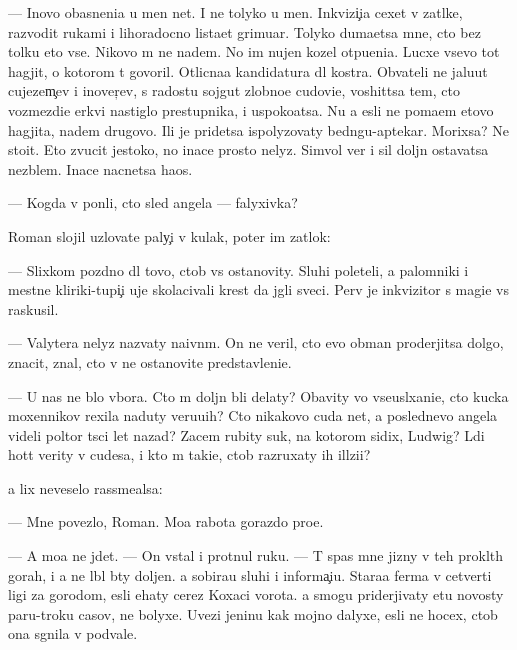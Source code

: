 \documentclass[10pt]{book}
\begin{document}
— Inovo ob{\y}asneni{\y}a u men{\ia} net. I ne tolyko u men{\ia}. Inkvizi{\c}i{\y}a cexet v zat{\yi}lke, razvodit rukami i lihoradocno lista{\y}et grimuar{\yi}. Tolyko duma{\y}etsa mne, cto bez tolku eto vse. Nikovo m{\yi} ne na{\y}dem. No im nujen kozel otpu{\x}eni{\y}a. Lucxe vsevo tot hagjit, o kotorom t{\yi} govoril. Otlicna{\y}a kandidatura dl{\ia} kostra. Ob{\yi}vateli ne jalu{\y}ut cujezem{\c}ev i inover{\c}ev, s radost{\y}u sojgut zlobno{\y}e cudovi{\x}e, voshit{\ia}tsa tem, cto vozmezdi{\y}e {\C}erkvi nastiglo prestupnika, i uspoko{\y}atsa. Nu a {\y}esli ne po{\y}ma{\y}em etovo hagjita, na{\y}dem drugovo. Ili je pridetsa ispolyzovaty bedn{\ia}gu-aptekar{\ia}. Mor{\x}ixsa? Ne sto{\y}it. Eto zvucit jestoko, no inace prosto nelyz{\ia}. Simvol{\yi} ver{\yi} i sil{\yi} doljn{\yi} ostavatsa nez{\yi}blem{\yi}. Inace nacnetsa haos.

— Kogda v{\yi} pon{\ia}li, cto sled angela — falyxivka?

Roman slojil uzlovat{\yi}{\y}e paly{\c}i v kulak, poter im zat{\yi}lok:

— Slixkom pozdno dl{\ia} tovo, ctob{\yi} vs{\e} ostanovity. Sluhi poleteli, a palomniki i mestn{\yi}{\y}e kliriki-tupi{\c}i uje skolacivali krest da jgli sveci. Perv{\yi}{\y} je inkvizitor s magi{\y}e{\y} vs{\e} raskusil.

— Valytera nelyz{\ia} nazvaty naivn{\yi}m. On ne veril, cto {\y}evo obman proderjitsa dolgo, znacit, znal, cto v{\yi} ne ostanovite predstavleni{\y}e.

— U nas ne b{\yi}lo v{\yi}bora. Cto m{\yi} doljn{\yi} b{\yi}li delaty? Ob{\y}avity vo vseusl{\yi}xani{\y}e, cto kucka moxennikov rexila naduty veru{\y}u{\x}ih? Cto nikakovo cuda net, a poslednevo angela videli poltor{\yi} t{\yi}s{\ia}ci let nazad? Zacem rubity suk, na kotorom sidix, Ludwig? L{\iu}di hot{\ia}t verity v cudesa, i kto m{\yi} taki{\y}e, ctob{\yi} razruxaty ih ill{\iu}zi{\y}i?

{\Y}a lix neveselo rassme{\y}alsa:

— Mne povezlo, Roman. Mo{\y}a rabota gorazdo pro{\x}e.

— A mo{\y}a ne jdet. — On vstal i prot{\ia}nul ruku. — T{\yi} spas mne jizny v teh prokl{\ia}t{\yi}h gorah, i {\y}a ne l{\iu}bl{\iu} b{\yi}ty doljen. {\Y}a sobira{\y}u sluhi i informa{\c}i{\y}u. Stara{\y}a ferma v cetverti ligi za gorodom, {\y}esli {\y}ehaty cerez Koxac{\yf}i vorota. {\Y}a smogu priderjivaty etu novosty paru-tro{\y}ku casov, ne bolyxe. Uvezi jen{\x}inu kak mojno dalyxe, {\y}esli ne hocex, ctob{\yi} ona sgnila v podvale.
\end{document}
